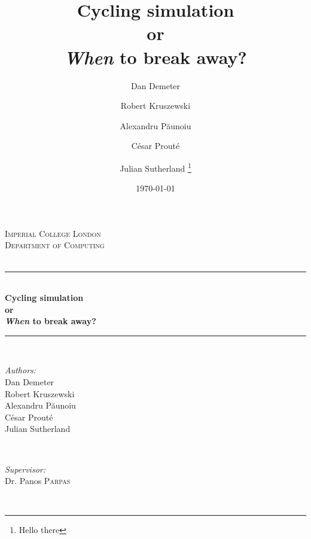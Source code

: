 \documentclass[10pt, a4paper]{report}
\title{Cycling simulation\\or\\\textit{When} to break away?}
\date{\today}
\author{Dan Demeter\and Robert Kruszewski\and Alexandru P\u{a}unoiu \and C\'esar Prout\'e \and Julian Sutherland \thanks{Hello there}}
\begin{document}
\begin{titlepage}

\newcommand{\HRule}{\rule{\linewidth}{0.5mm}} %

\center %
 

\textsc{\LARGE Imperial College London}\\[1.5cm] %
\textsc{\Large Department of Computing}\\[0.5cm] %
\textsc{\large}\\[0.5cm] %


\HRule \\[0.4cm]
{ \huge \bfseries Cycling simulation\\or\\\vspace{0.4cm}\textit{When} to break away?}\\[0.4cm] %
\HRule \\[1.5cm]
 

\begin{minipage}{0.4\textwidth}
\begin{flushleft} \large
\emph{Authors:}\\
Dan Demeter \\
Robert Kruszewski\\
Alexandru P\u{a}unoiu\\
C\'esar Prout\'e\\
Julian Sutherland
\end{flushleft}
\end{minipage}
~
\begin{minipage}{0.4\textwidth}
\begin{flushright} \large
\emph{Supervisor:} \\
Dr. Panos \textsc{Parpas} %
\end{flushright}
\end{minipage}\\[5cm]


\end{titlepage}
\end{document}
